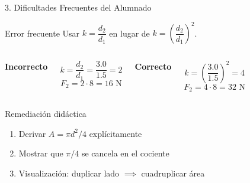 \documentclass[aspectratio=169,11pt]{beamer}
\newcommand{\stepbeat}[2]{}
\begin{document}
\begin{frame}{3. Dificultades Frecuentes del Alumnado}
  \begin{alertblock}{Error frecuente}
    Usar $k = \dfrac{d_2}{d_1}$ en lugar de $k = \left(\dfrac{d_2}{d_1}\right)^2$.
  \end{alertblock}

  \begin{columns}[t]
    \begin{center}
      \textcolor{errorred}{\textbf{Incorrecto}}
    \end{center}
    $$k = \frac{d_2}{d_1} = \frac{3.0}{1.5} = 2$$
    $$F_2 = 2 \cdot 8 = 16 \text{ N}$$
    \only<1>{\stepbeat{frame_dificultades}{error_comun}}

    \begin{center}
      \textcolor{correctgreen}{\textbf{Correcto}}
    \end{center}
    $$k = \left(\frac{3.0}{1.5}\right)^2 = 4$$
    $$F_2 = 4 \cdot 8 = 32 \text{ N}$$
    \only<2>{\stepbeat{frame_dificultades}{remediacion}}
  \end{columns}

  \vspace{0.3cm}
  \begin{block}{Remediación didáctica}
    \begin{enumerate}
      \item Derivar $A = \pi d^2/4$ explícitamente
      \item Mostrar que $\pi/4$ se cancela en el cociente
      \item Visualización: duplicar lado $\implies$ cuadruplicar área
    \end{enumerate}
  \end{block}
\end{frame}
\end{document}
